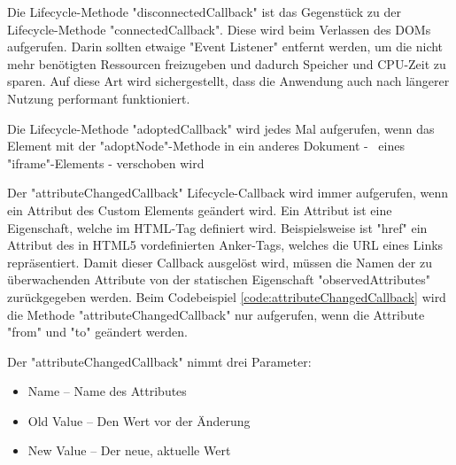 
Die Lifecycle-Methode "{\ttfamily disconnectedCallback}" ist das Gegenstück zu der Lifecycle-Methode "{\ttfamily connectedCallback}".
Diese wird beim Verlassen des DOMs aufgerufen. Darin sollten etwaige "Event Listener" entfernt werden, um die nicht mehr benötigten Ressourcen freizugeben und dadurch Speicher und CPU-Zeit zu sparen. 
Auf diese Art wird sichergestellt, dass die Anwendung auch nach längerer Nutzung performant funktioniert. \cite{MDNWebCustomElements}


Die Lifecycle-Methode "{\ttfamily adoptedCallback}" wird jedes Mal aufgerufen, wenn das Element mit der "{\ttfamily adoptNode}"-Methode in ein anderes Dokument - \zb\ eines "{\ttfamily iframe}"-Elements - verschoben wird \cite{MDNWebCustomElements}


Der "{\ttfamily attributeChangedCallback}" Lifecycle-Callback wird immer aufgerufen, wenn ein Attribut des Custom Elements geändert wird. 
Ein Attribut ist eine Eigenschaft, welche im HTML-Tag definiert wird. 
Beispielsweise ist "{\ttfamily href}" ein Attribut des in HTML5 vordefinierten Anker-Tags, welches die URL eines Links repräsentiert. 
Damit dieser Callback ausgelöst wird, müssen die Namen der zu überwachenden Attribute von der statischen Eigenschaft "{\ttfamily observedAttributes}" zurückgegeben werden. \cite{MDNWebCustomElements} Beim Codebeispiel \ref{code:attributeChangedCallback} wird die Methode "{\ttfamily attributeChangedCallback}" nur aufgerufen, wenn die Attribute "from" und "to" geändert werden.
    
Der "{\ttfamily attributeChangedCallback}" nimmt drei Parameter\cite{MDNWebCustomElements}:
\begin{itemize}
    \item Name -- Name des Attributes
    \item Old Value -- Den Wert vor der Änderung
    \item New Value -- Der neue, aktuelle Wert 
\end{itemize}


